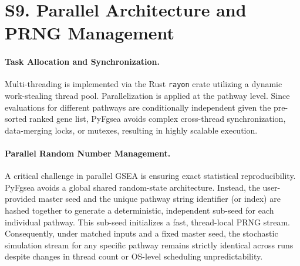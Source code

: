 \documentclass[11pt]{article}
\begin{document}
\section*{S9. Parallel Architecture and PRNG Management}

\paragraph{Task Allocation and Synchronization.}
Multi-threading is implemented via the Rust \texttt{rayon} crate utilizing a dynamic work-stealing thread pool. Parallelization is applied at the pathway level. Since evaluations for different pathways are conditionally independent given the pre-sorted ranked gene list, PyFgsea avoids complex cross-thread synchronization, data-merging locks, or mutexes, resulting in highly scalable execution.

\paragraph{Parallel Random Number Management.}
A critical challenge in parallel GSEA is ensuring exact statistical reproducibility. PyFgsea avoids a global shared random-state architecture. Instead, the user-provided master seed and the unique pathway string identifier (or index) are hashed together to generate a deterministic, independent sub-seed for each individual pathway. This sub-seed initializes a fast, thread-local PRNG stream. Consequently, under matched inputs and a fixed master seed, the stochastic simulation stream for any specific pathway remains strictly identical across runs despite changes in thread count or OS-level scheduling unpredictability.
\end{document}
